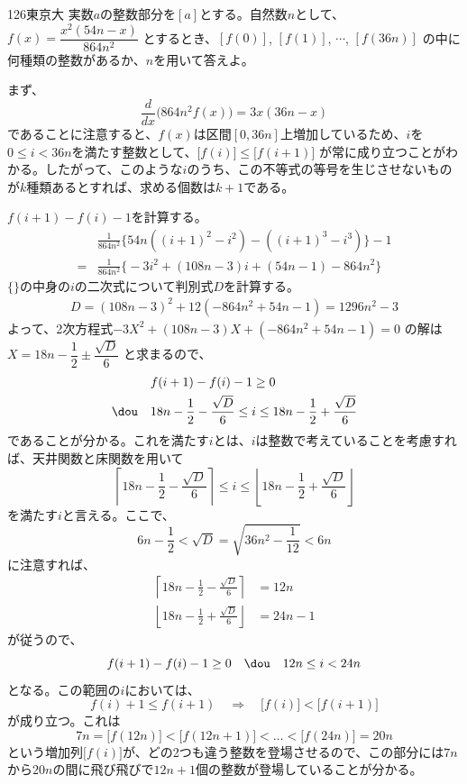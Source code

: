 \begin{prob}{126}{}{東京大}
 実数$a$の整数部分を$[a]$とする。自然数$n$として、$f(x)=\dfrac{x^2(54n-x)}{864n^2}$ とするとき、$[f(0)]$, $[f(1)]$, $\cdots$, $[f(36n)]$ の中に何種類の整数があるか、$n$を用いて答えよ。
\end{prob}
まず、
\[ \frac{d}{dx}\bigl(864n^2f(x)\bigr)=3x(36n-x) \]
であることに注意すると、$f(x)$は区間$[0,36n]$上増加しているため、$i$を$0\le i < 36n$を満たす整数として、$\bigl[f(i)\bigr] \le \bigl[f(i+1)\bigr]$ が常に成り立つことがわかる。したがって、このような$i$のうち、この不等式の等号を生じさせないものが$k$種類あるとすれば、求める個数は$k+1$である。

$f(i+1)-f(i)-1$を計算する。
\begin{align*}
 &\frac{1}{864n^2}\bigl\{54n( (i+1)^2-i^2 )-( (i+1)^3-i^3 )\bigr\} -1 \\
 =&\frac{1}{864n^2}\bigl\{-3i^2+(108n-3)i+(54n-1)-864n^2\bigr\}
\end{align*}
$\{{}\}$の中身の$i$の二次式について判別式$D$を計算する。
\begin{align*}
 D=(108n-3)^2+12(-864n^2+54n-1)=1296n^2-3
\end{align*}
よって、2次方程式$-3X^2+(108n-3)X+(-864n^2+54n-1)=0$ の解は$X=18n-\dfrac{1}{2}\pm\dfrac{\sqrt{D}}{6}$ と求まるので、
\begin{align*}
 &f(i+1)-f(i)-1\ge 0 \\
 \dou\quad & 18n-\frac{1}{2}-\frac{\sqrt{D}}{6}\le i\le 18n-\frac{1}{2}+\frac{\sqrt{D}}{6}
\end{align*}
であることが分かる。これを満たす$i$とは、$i$は整数で考えていることを考慮すれば、天井関数と床関数を用いて
\[ \left\lceil 18n-\frac{1}{2}-\frac{\sqrt{D}}{6}\right\rceil \le i\le \left\lfloor 18n-\frac{1}{2}+\frac{\sqrt{D}}{6}\right\rfloor \]
を満たす$i$と言える。ここで、
\[ 6n-\frac{1}{2} < \sqrt{D}=\sqrt{36n^2-\frac{1}{12}} < 6n \]
に注意すれば、
\begin{align*}
 \left\lceil 18n-\frac{1}{2}-\frac{\sqrt{D}}{6}\right\rceil &= 12n \\
 \left\lfloor 18n-\frac{1}{2}+\frac{\sqrt{D}}{6}\right\rfloor &= 24n-1
\end{align*}
が従うので、
\[ f(i+1)-f(i)-1 \ge 0 \quad\dou\quad 12n\le i < 24n \]
となる。この範囲の$i$においては、
\[ f(i)+1\le f(i+1) \quad\Rightarrow\quad \bigl[f(i)\bigr] < \bigl[f(i+1)\bigr] \]
が成り立つ。これは
\[ 7n=\bigl[f(12n)\bigr]<\bigl[f(12n+1)\bigr]<\dots <\bigl[f(24n)\bigr]=20n \]
という増加列$\bigl[f(i)\bigr]$が、どの2つも違う整数を登場させるので、この部分には$7n$から$20n$の間に飛び飛びで$12n+1$個の整数が登場していることが分かる。

